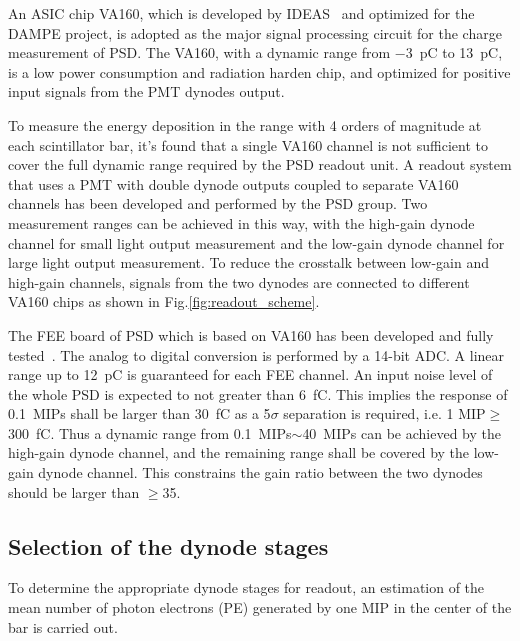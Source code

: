 \documentclass[preprint, times]{elsarticle}
\begin{document}
 An ASIC chip VA160, which is developed by IDEAS~\cite{va160} and optimized for the DAMPE project, is adopted as the major signal processing circuit for the charge measurement of PSD.
 The VA160, with a dynamic range from \SI{-3}{\pico\coulomb} to \SI{13}{\pico\coulomb}, is a low power consumption and radiation harden chip, and optimized for positive input signals from the PMT dynodes output.

To measure the energy deposition in the range with 4 orders of magnitude at each scintillator bar, it's found that a single VA160 channel is not sufficient to cover the full dynamic range required by the PSD readout unit. A readout system that uses a PMT with double dynode outputs coupled to separate VA160 channels has been developed and performed by the PSD group. Two measurement ranges can be achieved in this way, with the high-gain dynode channel for small light output measurement and the low-gain dynode channel for large light output measurement. To reduce the crosstalk between low-gain and high-gain channels, signals from the two dynodes are connected to different VA160 chips as shown in Fig.\ref{fig:readout_scheme}.

The FEE board of PSD which is based on VA160 has been developed and fully tested~\cite{fee}. The analog to digital conversion is performed by a 14-bit ADC. A linear range up to \SI{12}{\pico\coulomb} is guaranteed for each FEE channel. An input noise level of the whole PSD is expected to not greater than \SI{6}{\femto\coulomb}. This implies the response of \SI{0.1}{MIPs} shall be larger than \SI{30}{\femto\coulomb} as a 5$\sigma$ separation is required, i.e. 1 MIP$\geq$\SI{300}{\femto\coulomb}.
 Thus a dynamic range from \SI{0.1}{MIPs}$\sim$\SI{40}{MIPs} can be achieved by the high-gain dynode channel, and the remaining range shall be covered by the low-gain dynode channel.
This constrains the gain ratio between the two dynodes should be larger than $\geq$35.

\subsection{Selection of the dynode stages}
\label{sec:dynodes_selection}
To determine the appropriate dynode stages for readout, an estimation of the mean number of photon electrons (PE) generated by one MIP in the center of the bar is carried out.
\end{document}

